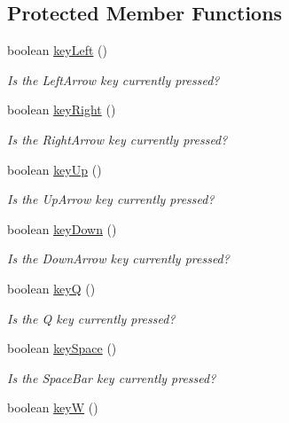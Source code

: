 \subsection*{Protected Member Functions}
\begin{DoxyCompactItemize}
\item 
boolean \hyperlink{classbridges_1_1games_1_1_non_blocking_game_ac8b9a6d6d4074105af6d28995091bd2b}{key\+Left} ()
\begin{DoxyCompactList}\small\item\em Is the Left\+Arrow key currently pressed? \end{DoxyCompactList}\item 
boolean \hyperlink{classbridges_1_1games_1_1_non_blocking_game_a5a3db63942e995409daaf6b89f88b203}{key\+Right} ()
\begin{DoxyCompactList}\small\item\em Is the Right\+Arrow key currently pressed? \end{DoxyCompactList}\item 
boolean \hyperlink{classbridges_1_1games_1_1_non_blocking_game_a524c340fabec1b7a69aa742e1347b7b4}{key\+Up} ()
\begin{DoxyCompactList}\small\item\em Is the Up\+Arrow key currently pressed? \end{DoxyCompactList}\item 
boolean \hyperlink{classbridges_1_1games_1_1_non_blocking_game_ac59c5ac18a456cc1d69ec8d42a311840}{key\+Down} ()
\begin{DoxyCompactList}\small\item\em Is the Down\+Arrow key currently pressed? \end{DoxyCompactList}\item 
boolean \hyperlink{classbridges_1_1games_1_1_non_blocking_game_a4075b3185f2fe0d20c9ed9957c448aee}{keyQ} ()
\begin{DoxyCompactList}\small\item\em Is the Q key currently pressed? \end{DoxyCompactList}\item 
boolean \hyperlink{classbridges_1_1games_1_1_non_blocking_game_a4ff32a8ba8aeb3f438751729f7380d16}{key\+Space} ()
\begin{DoxyCompactList}\small\item\em Is the Space\+Bar key currently pressed? \end{DoxyCompactList}\item 
boolean \hyperlink{classbridges_1_1games_1_1_non_blocking_game_a45db18869044968a233a6f217650e34d}{keyW} ()

\end{DoxyCompactItemize}
